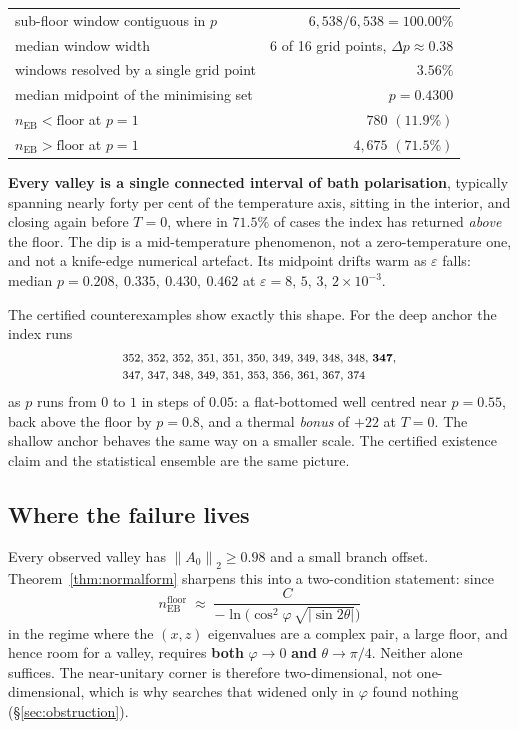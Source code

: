 \documentclass[11pt,a4paper]{article}
\theoremstyle{definition}
\theoremstyle{remark}
\newcommand{\nEB}{n_{\mathrm{EB}}}
\newcommand{\floor}{n_{\mathrm{EB}}^{\mathrm{floor}}}
\newcommand{\opn}[1]{\left\lVert #1 \right\rVert_{2}}
\begin{document}
\begin{center}
\begin{tabular}{lr}
\toprule
sub-floor window contiguous in $p$ & \textbf{$6{,}538 / 6{,}538 = 100.00\%$}\\
median window width & 6 of 16 grid points, $\Delta p \approx 0.38$\\
windows resolved by a single grid point & $3.56\%$\\
median midpoint of the minimising set & $p = 0.4300$\\
$\nEB < \mathrm{floor}$ at $p = 1$ & $780$ $(11.9\%)$\\
$\nEB > \mathrm{floor}$ at $p = 1$ & $4{,}675$ $(71.5\%)$\\
\bottomrule
\end{tabular}
\end{center}

\textbf{Every valley is a single connected interval of bath polarisation}, typically spanning nearly forty per cent of the temperature axis, sitting in the interior, and closing again before $T = 0$, where in $71.5\%$ of cases the index has returned \emph{above} the floor. The dip is a mid-temperature phenomenon, not a zero-temperature one, and not a knife-edge numerical artefact. Its midpoint drifts warm as $\varepsilon$ falls: median $p = 0.208,\ 0.335,\ 0.430,\ 0.462$ at $\varepsilon = 8,\,5,\,3,\,2 \times10^{-3}$.

The certified counterexamples show exactly this shape. For the deep anchor the index runs
\[
  \footnotesize
  \begin{aligned}
    &352,\,352,\,352,\,351,\,351,\,350,\,349,\,349,\,348,\,348,\,\mathbf{347},\\
    &347,\,347,\,348,\,349,\,351,\,353,\,356,\,361,\,367,\,374
  \end{aligned}
\]
as $p$ runs from $0$ to $1$ in steps of $0.05$: a flat-bottomed well centred near $p = 0.55$, back above the floor by $p = 0.8$, and a thermal \emph{bonus} of $+22$ at $T=0$. The shallow anchor behaves the same way on a smaller scale. The certified existence claim and the statistical ensemble are the same picture.

\subsection{Where the failure lives}\label{sec:wherefails}

Every observed valley has $\opn{A_0} \ge 0.98$ and a small branch offset. Theorem~\ref{thm:normalform} sharpens this into a two-condition statement: since
\begin{equation}\label{eq:floorasym}
  \floor \;\approx\; \frac{C}{-\ln\!\big(\cos^2\!\varphi\,\sqrt{|\sin 2\theta|}\big)}
\end{equation}
in the regime where the $(x,z)$ eigenvalues are a complex pair, a large floor, and hence room for a valley, requires \textbf{both} $\varphi \to 0$ \textbf{and} $\theta \to \pi/4$. Neither alone suffices. The near-unitary corner is therefore two-dimensional, not one-dimensional, which is why searches that widened only in $\varphi$ found nothing (\S\ref{sec:obstruction}).
\end{document}

